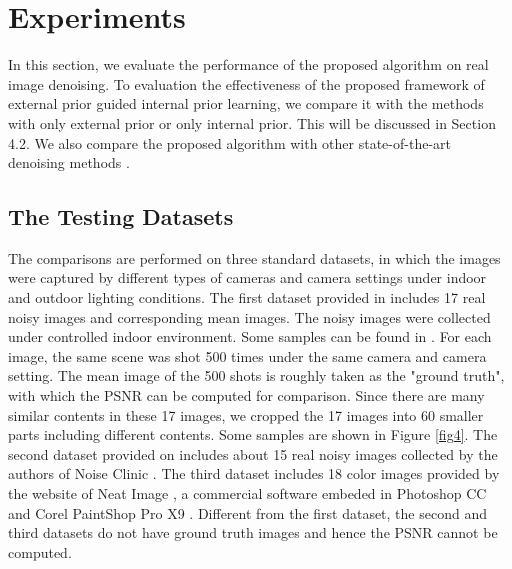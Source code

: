 \documentclass[10pt,twocolumn,letterpaper]{article}
\begin{document}
\section{Experiments}

In this section, we evaluate the performance of the proposed algorithm on real image denoising. To evaluation the effectiveness of the proposed framework of external prior guided internal prior learning, we compare it with the methods with only external prior or only internal prior. This will be discussed in Section 4.2. We also compare the proposed algorithm with other state-of-the-art denoising methods \cite{bm3d,cbm3d,mlp,wnnm,csf,chen2015learning,crosschannel2016,noiseclinic,ncwebsite,neatimage}.

\subsection{The Testing Datasets}
The comparisons are performed on three standard datasets, in which the images were captured by different types of cameras and camera settings under indoor and outdoor lighting conditions. The first dataset provided in \cite{crosschannel2016} includes 17 real noisy images and corresponding mean images. The noisy images were collected under controlled indoor environment. Some samples can be found in \cite{crosschannel2016}. For each image, the same scene was shot 500 times under the same camera and camera setting. The mean image of the 500 shots is roughly taken as the "ground truth", with which the PSNR can be computed for comparison. Since there are many similar contents in these 17 images, we cropped the 17 images into 60 smaller parts including different contents. Some samples are shown in Figure \ref{fig4}. The second dataset provided on \cite{ncwebsite} includes about 15 real noisy images collected by the authors of Noise Clinic \cite{noiseclinic}. The third dataset includes 18 color images provided by the website of Neat Image \cite{neatimage}, a commercial software embeded in Photoshop CC and Corel PaintShop Pro X9 \cite{neatimage}. Different from the first dataset, the second and third datasets do not have ground truth images and hence the PSNR cannot be computed. 
\end{document}
